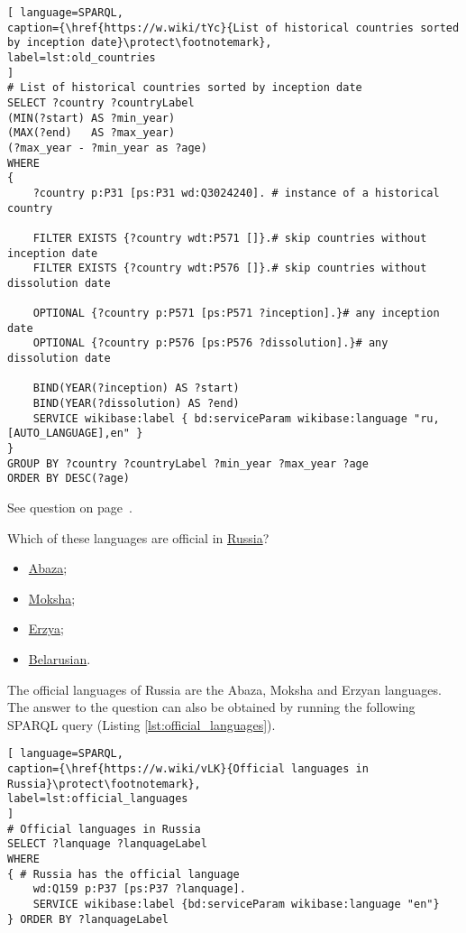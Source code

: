 \begin{lstlisting}[ language=SPARQL, 
caption={\href{https://w.wiki/tYc}{List of historical countries sorted by inception date}\protect\footnotemark},
label=lst:old_countries
]
# List of historical countries sorted by inception date
SELECT ?country ?countryLabel 
(MIN(?start) AS ?min_year)
(MAX(?end)   AS ?max_year) 
(?max_year - ?min_year as ?age)
WHERE
{
	?country p:P31 [ps:P31 wd:Q3024240]. # instance of a historical country
	
	FILTER EXISTS {?country wdt:P571 []}.# skip countries without inception date
	FILTER EXISTS {?country wdt:P576 []}.# skip countries without dissolution date
	
	OPTIONAL {?country p:P571 [ps:P571 ?inception].}# any inception date
	OPTIONAL {?country p:P576 [ps:P576 ?dissolution].}# any dissolution date
	
	BIND(YEAR(?inception) AS ?start)
	BIND(YEAR(?dissolution) AS ?end)  
	SERVICE wikibase:label { bd:serviceParam wikibase:language "ru,[AUTO_LANGUAGE],en" }
}
GROUP BY ?country ?countryLabel ?min_year ?max_year ?age
ORDER BY DESC(?age)
\end{lstlisting}

See question on page~\pageref{question:old_countries}.
\begin{exercise}
\label{answer:official_languages}
Which of these languages are official in \href{https://en.wikipedia.org/wiki/Russia}{Russia}?
\begin{itemize}
\item \href{https://en.wikipedia.org/wiki/Abaza_language}{Abaza};
\item \href{https://en.wikipedia.org/wiki/Moksha_language}{Moksha};
\item \href{https://en.wikipedia.org/wiki/Erzya_language}{Erzya};
\item \href{https://en.wikipedia.org/wiki/Belarusian_language}{Belarusian}.
\end{itemize}
\end{exercise}

The official languages of Russia are the Abaza, Moksha and Erzyan languages. The answer to the question can also be obtained by running the following SPARQL query (Listing \ref{lst:official_languages}).

\begin{lstlisting}[ language=SPARQL, 
caption={\href{https://w.wiki/vLK}{Official languages in Russia}\protect\footnotemark},
label=lst:official_languages
]
# Official languages in Russia
SELECT ?lanquage ?lanquageLabel
WHERE
{ # Russia has the official language
	wd:Q159 p:P37 [ps:P37 ?lanquage].
	SERVICE wikibase:label {bd:serviceParam wikibase:language "en"}
} ORDER BY ?lanquageLabel
\end{lstlisting}

